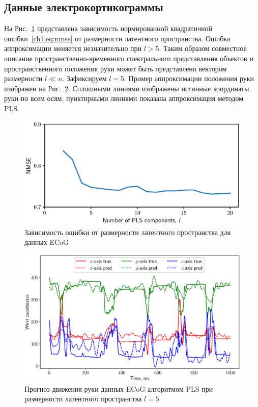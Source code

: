 \subsection*{Данные электрокортикограммы}

На Рис.~\ref{ch1:fig:ecog_n_comp} представлена зависимость нормированной квадратичной ошибки~\eqref{ch1:eq:nmse} от размерности латентного пространства. Ошибка аппроксимации меняется незначительно при $l > 5$.
Таким образом совместное описание пространственно-временного спектрального представления объектов и пространственного положения руки может быть представлено вектором размерности $l \ll n$.
Зафиксируем $l = 5$. 
Пример аппроксимации положения руки изображен на Рис.~\ref{ch1:fig:ecog_prediction}. 
Сплошными линиями изображены истинные координаты руки по всем осям, пунктирными линиями показана аппроксимация методом PLS.
 
\begin{figure}[ht]
	\centering
	\includegraphics[width=0.75\linewidth]{figs/ch1/ecog_n_comp}	
	\caption{Зависимость ошибки от размерности латентного пространства для данных ECoG}
	\label{ch1:fig:ecog_n_comp}
\end{figure}

\begin{figure}[ht]
	\centering
	\includegraphics[width=\textwidth]{figs/ch1/ecog_prediction}
	\caption{Прогноз движения руки данных ECoG алгоритмом PLS при размерности латентного пространства $l=5$}
	\label{ch1:fig:ecog_prediction}
\end{figure}

